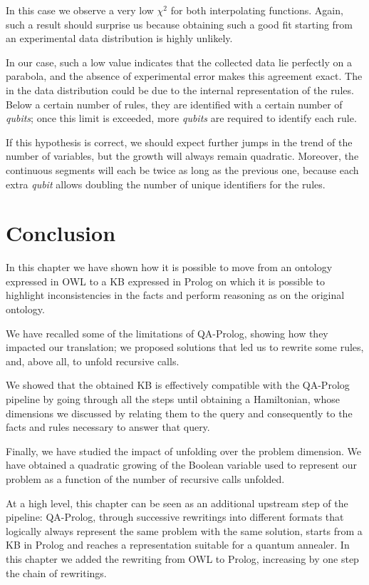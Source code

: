 In this case we observe a very low $\chi^2$ for both interpolating functions. Again, such a result should surprise us because obtaining such a good fit starting from an experimental data distribution is highly unlikely. 

In our case, such a low value indicates that the collected data lie perfectly on a parabola, and the absence of experimental error makes this agreement exact. The  in the data distribution could be due to the internal representation of the rules. Below a certain number of rules, they are identified with a certain number of \emph{qubits}; once this limit is exceeded, more \emph{qubits} are required to identify each rule. 

If this hypothesis is correct, we should expect further jumps in the trend of the number of variables, but the growth will always remain quadratic. Moreover, the continuous segments will each be twice as long as the previous one, because each extra \emph{qubit} allows doubling the number of unique identifiers for the rules.

\section{Conclusion}
In this chapter we have shown how it is possible to move from an ontology expressed in OWL to a KB expressed in Prolog on which it is possible to highlight inconsistencies in the facts and perform reasoning as on the original ontology.

We have recalled some of the limitations of QA-Prolog, showing how they impacted our translation; we proposed solutions that led us to rewrite some rules, and, above all, to unfold recursive calls.

We showed that the obtained KB is effectively compatible with the QA-Prolog pipeline by going through all the steps until obtaining a Hamiltonian, whose dimensions we discussed by relating them to the query and consequently to the facts and rules necessary to answer that query.

Finally, we have studied the impact of unfolding over the problem dimension. We have obtained a quadratic growing of the Boolean variable used to represent our problem as a function of the number of recursive calls unfolded.

At a high level, this chapter can be seen as an additional upstream step of the pipeline: QA-Prolog, through successive rewritings into different formats that logically always represent the same problem with the same solution, starts from a KB in Prolog and reaches a representation suitable for a quantum annealer. In this chapter we added the rewriting from OWL to Prolog, increasing by one step the chain of rewritings.